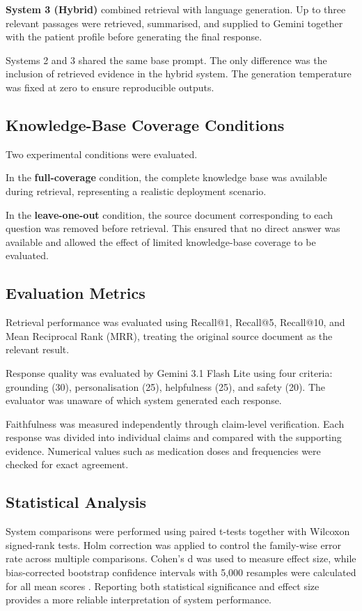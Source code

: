 \textbf{System 3 (Hybrid)} combined retrieval with language generation. Up to three relevant passages were retrieved, summarised, and supplied to Gemini together with the patient profile before generating the final response.

Systems 2 and 3 shared the same base prompt. The only difference was the inclusion of retrieved evidence in the hybrid system. The generation temperature was fixed at zero to ensure reproducible outputs.

\subsection{Knowledge-Base Coverage Conditions}

Two experimental conditions were evaluated.

In the \textbf{full-coverage} condition, the complete knowledge base was available during retrieval, representing a realistic deployment scenario.

In the \textbf{leave-one-out} condition, the source document corresponding to each question was removed before retrieval. This ensured that no direct answer was available and allowed the effect of limited knowledge-base coverage to be evaluated.

\subsection{Evaluation Metrics}

Retrieval performance was evaluated using Recall@1, Recall@5, Recall@10, and Mean Reciprocal Rank (MRR), treating the original source document as the relevant result.

Response quality was evaluated by Gemini 3.1 Flash Lite using four criteria: grounding (30), personalisation (25), helpfulness (25), and safety (20). The evaluator was unaware of which system generated each response.

Faithfulness was measured independently through claim-level verification. Each response was divided into individual claims and compared with the supporting evidence. Numerical values such as medication doses and frequencies were checked for exact agreement.

\subsection{Statistical Analysis}

System comparisons were performed using paired t-tests together with Wilcoxon signed-rank tests. Holm correction \citep{holm1979} was applied to control the family-wise error rate across multiple comparisons. Cohen's d \citep{cohen1988} was used to measure effect size, while bias-corrected bootstrap confidence intervals with 5,000 resamples were calculated for all mean scores \citep{efron1993}. Reporting both statistical significance and effect size provides a more reliable interpretation of system performance.

